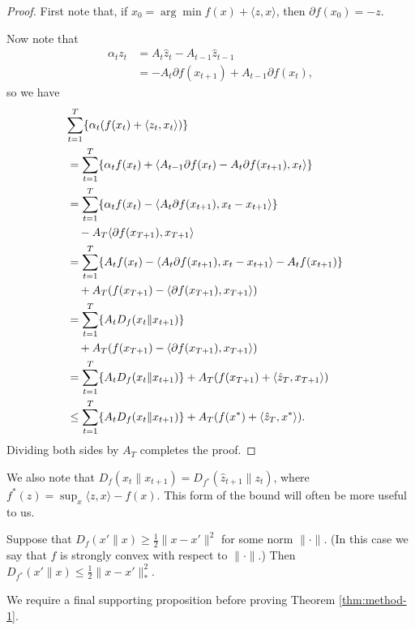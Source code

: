 \documentclass{article} %
\begin{document}
\begin{proof}
First note that, if $x_0 = \arg\min f(x) + \langle z, x \rangle$, 
then $\partial f(x_0) = -z$.

Now note that
\begin{align}
\alpha_{t}z_{t} 
&= A_{t}\hat z_{t} - A_{t-1}\hat z_{t-1} \\
&= - A_{t}\partial f(x_{t+1}) + A_{t-1} \partial f(x_{t}),
\end{align}
so we have
\begin{align} 
\lefteqn{\sum_{t=1}^T \{\alpha_t(f(x_t) + \langle z_t, x_t \rangle)\}} \\
 &= \sum_{t=1}^T \{\alpha_t f(x_t) + \langle A_{t-1} \partial f(x_t) - A_t \partial f(x_{t+1}), x_t \rangle\} \\
 &= \sum_{t=1}^T \{\alpha_t f(x_t) - \langle A_{t} \partial f(x_{t+1}), x_t-x_{t+1} \rangle\} \\
 & \quad - A_{T}\langle \partial f(x_{T+1}), x_{T+1} \rangle \\
 &= \sum_{t=1}^T \{A_t f(x_t) - \langle A_{t} \partial f(x_{t+1}), x_t-x_{t+1} \rangle - A_t f(x_{t+1})\}  \\
 &\quad+ A_T(f(x_{T+1}) - \langle \partial f(x_{T+1}), x_{T+1} \rangle) \nonumber \\ 
 &= \sum_{t=1}^T \{A_tD_f(x_t \| x_{t+1})\}  \\ 
 &\quad+ A_T(f(x_{T+1}) - \langle \partial f(x_{T+1}), x_{T+1} \rangle) \nonumber \\
 &= \sum_{t=1}^T \{A_tD_f(x_t \| x_{t+1})\} + A_T(f(x_{T+1}) + \langle \hat{z}_T, x_{T+1} \rangle) \\
 &\leq \sum_{t=1}^T \{A_tD_f(x_t \| x_{t+1})\} + A_T(f(x^*) + \langle \hat{z}_T, x^* \rangle). 
\end{align}
Dividing both sides by $A_T$ completes the proof.
\end{proof}

We also note that $D_f(x_t \| x_{t+1}) = D_{f^*}(\hat{z}_{t+1} \| z_t)$, where $f^*(z) = \sup_x \langle z,x\rangle - f(x)$. 
This form of the bound will often be more useful to us.
\begin{lemma}
\label{lem:convexity}
Suppose that $D_f(x' \| x) \geq \frac{1}{2}\|x-x'\|^2$ for some 
norm $\|\cdot\|$. (In this case we say that $f$ is strongly 
convex with respect to $\|\cdot\|$.) 
Then $D_{f^*}(x' \| x) \leq \frac{1}{2}\|x-x'\|_{*}^2$.
\end{lemma}

We require a final supporting proposition before proving Theorem \ref{thm:method-1}. 
\end{document}
